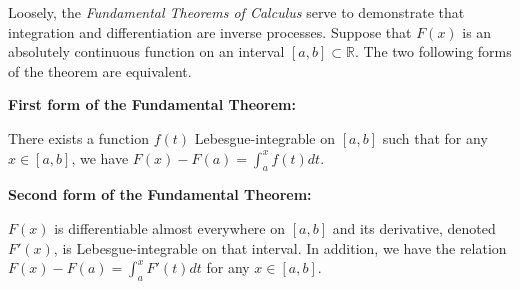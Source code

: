 \documentclass[12pt]{article}
\begin{document}
Loosely, the \emph{Fundamental Theorems of Calculus} serve to demonstrate that integration and differentiation are inverse processes.  Suppose that $F(x)$ is an absolutely continuous function on an interval $[a,b]\subset\mathbb{R}$.  The two following forms of the theorem are equivalent.

{\bf First form of the Fundamental Theorem:}

There exists a function $f(t)$ Lebesgue-integrable on $[a,b]$ such that for any $x\in [a,b]$, we have $F(x)-F(a)=\int_a^x f(t) dt$.

{\bf Second form of the Fundamental Theorem:}

$F(x)$ is differentiable almost everywhere on $[a,b]$ and its derivative, denoted $F'(x)$, is Lebesgue-integrable on that interval.  In addition, we have the relation $F(x)-F(a)=\int_a^x F'(t)dt$ for any $x\in [a,b]$.
\end{document}
